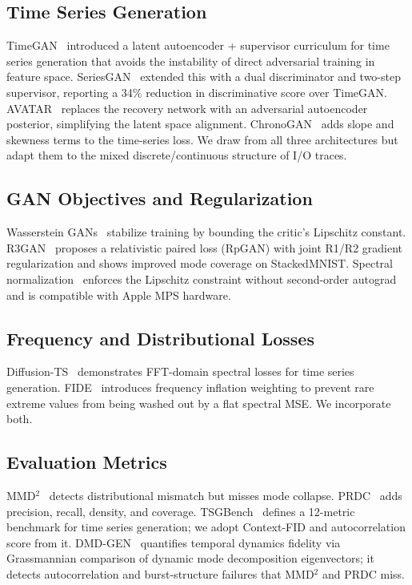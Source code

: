 \documentclass[10pt,twocolumn]{article}
\begin{document}
\subsection{Time Series Generation}

TimeGAN~\cite{yoon2019timegan} introduced a latent autoencoder +
supervisor curriculum for time series generation that avoids the
instability of direct adversarial training in feature space.
SeriesGAN~\cite{seriesgan2024} extended this with a dual discriminator
and two-step supervisor, reporting a 34\% reduction in discriminative
score over TimeGAN.  AVATAR~\cite{avatar2025} replaces the recovery
network with an adversarial autoencoder posterior, simplifying the
latent space alignment.  ChronoGAN~\cite{chronogan2024} adds
slope and skewness terms to the time-series loss.  We draw from
all three architectures but adapt them to the mixed discrete/continuous
structure of I/O traces.

\subsection{GAN Objectives and Regularization}

Wasserstein GANs~\cite{gulrajani2017wgangp} stabilize training by
bounding the critic's Lipschitz constant.  R3GAN~\cite{r3gan2024}
proposes a relativistic paired loss (RpGAN) with joint R1/R2
gradient regularization and shows improved mode coverage on
StackedMNIST.  Spectral normalization~\cite{miyato2018spectralnorm}
enforces the Lipschitz constraint without second-order autograd and
is compatible with Apple MPS hardware.

\subsection{Frequency and Distributional Losses}

Diffusion-TS~\cite{diffusionts2024} demonstrates FFT-domain spectral
losses for time series generation.  FIDE~\cite{fide2024} introduces
frequency inflation weighting to prevent rare extreme values from being
washed out by a flat spectral MSE.  We incorporate both.

\subsection{Evaluation Metrics}

MMD$^2$~\cite{todo} detects distributional mismatch but misses
mode collapse.  PRDC~\cite{naeem2020reliable} adds precision, recall,
density, and coverage.  TSGBench~\cite{tsgbench2024} defines a
12-metric benchmark for time series generation; we adopt Context-FID
and autocorrelation score from it.  DMD-GEN~\cite{dmdgen2025}
quantifies temporal dynamics fidelity via Grassmannian comparison of
dynamic mode decomposition eigenvectors; it detects autocorrelation
and burst-structure failures that MMD$^2$ and PRDC miss.
\end{document}
